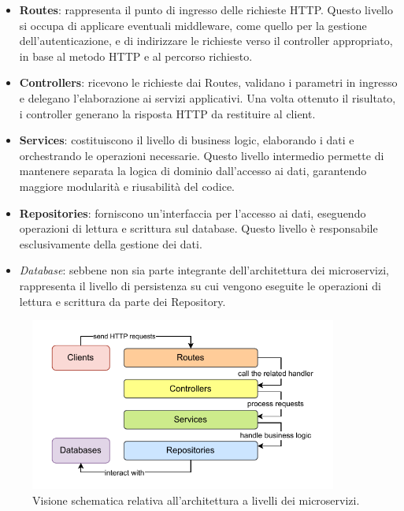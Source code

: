 \begin{itemize}
  \item \textbf{Routes}: rappresenta il punto di ingresso delle richieste HTTP. Questo livello si occupa di applicare eventuali middleware, come quello per la gestione dell'autenticazione, e di indirizzare le richieste verso il controller appropriato, in base al metodo HTTP e al percorso richiesto.

  \item \textbf{Controllers}: ricevono le richieste dai Routes, validano i parametri in ingresso e delegano l'elaborazione ai servizi applicativi. Una volta ottenuto il risultato, i controller generano la risposta HTTP da restituire al client.

  \item \textbf{Services}: costituiscono il livello di business logic, elaborando i dati e orchestrando le operazioni necessarie. Questo livello intermedio permette di mantenere separata la logica di dominio dall'accesso ai dati, garantendo maggiore modularità e riusabilità del codice.

  \item \textbf{Repositories}: forniscono un'interfaccia per l'accesso ai dati, eseguendo operazioni di lettura e scrittura sul database. Questo livello è responsabile esclusivamente della gestione dei dati.

  \item \textit{Database}: sebbene non sia parte integrante dell'architettura dei microservizi, rappresenta il livello di persistenza su cui vengono eseguite le operazioni di lettura e scrittura da parte dei Repository.
\end{itemize}

\begin{figure}
  \centering
  \includegraphics[width=0.9\textwidth]{figures/microservice-architecture.pdf}
  \caption{Visione schematica relativa all'architettura a livelli dei microservizi.}
  \label{fig:microservice-architecture}
\end{figure}

